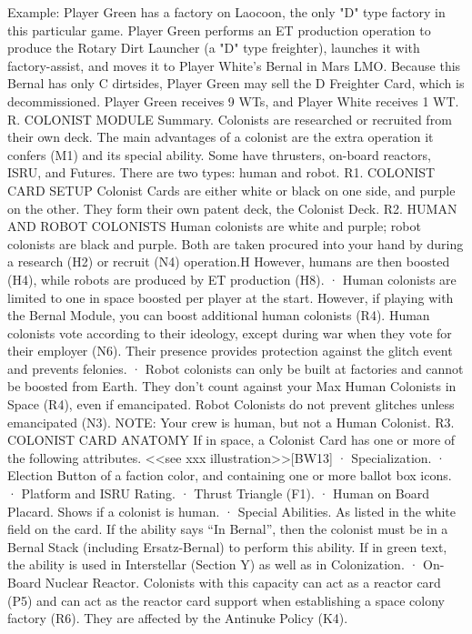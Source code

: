 \documentclass[a4paper]{book}
\begin{document}
Example: Player Green has a factory on Laocoon, the only "D" type factory in this particular game. Player Green performs an ET production operation to produce the Rotary Dirt Launcher (a "D" type freighter), launches it with factory-assist, and moves it to Player White's Bernal in Mars LMO. Because this Bernal has only C dirtsides, Player Green may sell the D Freighter Card, which is decommissioned. Player Green receives 9 WTs, and Player White receives 1 WT.
R. COLONIST MODULE
Summary. Colonists are researched or recruited from their own deck. The main advantages of a colonist are the extra operation it confers (M1) and its special ability. Some have thrusters, on-board reactors, ISRU, and Futures. There are two types: human and robot.
R1. COLONIST CARD SETUP
Colonist Cards are either white or black on one side, and purple on the other. They form their own patent deck, the Colonist Deck.
R2. HUMAN AND ROBOT COLONISTS
Human colonists are white and purple; robot colonists are black and purple. Both are taken procured into your hand by during a research (H2) or recruit (N4) operation.H However, humans are then boosted (H4), while robots are produced by ET production (H8).
·       Human colonists are limited to one in space boosted per player at the start. However, if playing with the Bernal Module, you can boost additional human colonists (R4). Human colonists vote according to their ideology, except during war when they vote for their employer (N6). Their presence provides protection against the glitch event and prevents felonies.
·       Robot colonists can only be built at factories and cannot be boosted from Earth. They don’t count against your Max Human Colonists in Space (R4), even if emancipated. Robot Colonists do not prevent glitches unless emancipated (N3).
NOTE: Your crew is human, but not a Human Colonist.
R3. COLONIST CARD ANATOMY
If in space, a Colonist Card has one or more of the following attributes. <<see xxx illustration>>[BW13] 
·       Specialization.
·       Election Button of a faction color, and containing one or more ballot box icons.
·       Platform and ISRU Rating.
·       Thrust Triangle (F1).
·       Human on Board Placard. Shows if a colonist is human.
·       Special Abilities. As listed in the white field on the card. If the ability says “In Bernal”, then the colonist must be in a Bernal Stack (including Ersatz-Bernal) to perform this ability. If in green text, the ability is used in Interstellar (Section Y) as well as in Colonization.
·       On-Board Nuclear Reactor. Colonists with this capacity can act as a reactor card (P5) and can act as the reactor card support when establishing a space colony factory (R6). They are affected by the Antinuke Policy (K4).
\end{document}

